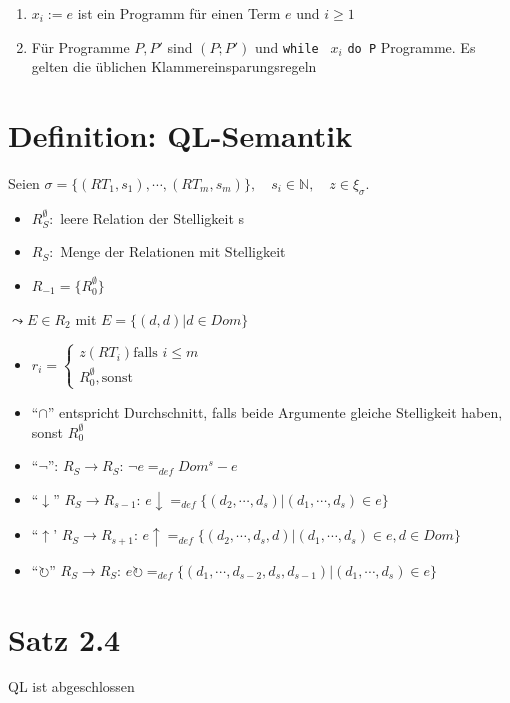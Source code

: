 \documentclass[12pt, a4paper]{article}
\begin{document}
\begin{enumerate}
\item $x_i := e$ ist ein Programm für einen Term $e$ und $i \ge 1$
\item Für Programme $P,P'$ sind $(P; P')$ und \texttt{while } $x_i$ \texttt{do P} Programme. Es gelten die üblichen Klammereinsparungsregeln
\end{enumerate}

\section*{Definition: QL-Semantik}

Seien $\sigma = \{ (RT_1, s_1), \cdots, (RT_m, s_m) \},\quad s_i \in \mathbb{N}, \quad z \in \xi_\sigma$.
\begin{itemize}
\item $R^\emptyset_S:$ leere Relation der Stelligkeit s
\item $R_S:$ Menge der Relationen mit Stelligkeit
\item $R_{-1} = \{ R^\emptyset_0 \}$
\end{itemize}

$\leadsto E \in R_2$  mit $E = \{ (d,d) | d \in Dom \}$ \\

\begin{itemize}
\item $r_i = \begin{cases} z(RT_i) \text{falls } i \le m \\ R^\emptyset_0, \text{sonst} \end{cases}$
\item ``$\cap$'' entspricht Durchschnitt, falls beide Argumente gleiche Stelligkeit haben, sonst $R^\emptyset_0$
\item ``$\lnot$'': $R_S \rightarrow R_S$: $\lnot e =_{def} Dom^s - e$
\item ``$\downarrow$'' $R_S \rightarrow R_{s-1}$: $e\downarrow =_{def} \{ (d_2, \cdots, d_s) | (d_1, \cdots, d_s) \in e \}$
\item ``$\uparrow$' $R_S \rightarrow R_{s+1}$: $e\uparrow =_{def} \{ (d_2, \cdots, d_s, d) | (d_1, \cdots, d_s) \in e, d \in Dom \}$
\item ``$\circlearrowright$'' $R_S \rightarrow R_S$: $e\circlearrowright =_{def} \{ (d_1, \cdots, d_{s-2}, d_s, d_{s-1}) | (d_1, \cdots, d_s) \in e \}$
\end{itemize}

\section*{Satz 2.4} 
QL ist abgeschlossen
\end{document}
